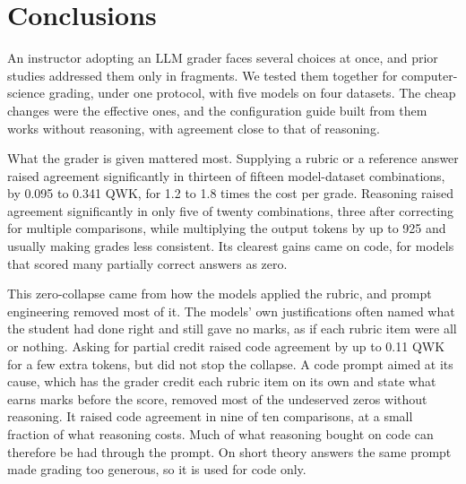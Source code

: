 
\section{Conclusions}
\label{sec:conclusion}

An instructor adopting an LLM grader faces several choices at once, and prior studies addressed them only in
fragments. We tested them together for computer-science grading, under one protocol, with five models on four
datasets. The cheap changes were the effective ones, and the configuration guide built from them works without
reasoning, with agreement close to that of reasoning.

What the grader is given mattered most. Supplying a rubric or a reference answer raised agreement significantly
in thirteen of fifteen model-dataset combinations, by 0.095 to 0.341 QWK, for 1.2 to 1.8 times the cost per grade.
Reasoning raised agreement significantly in only five of twenty combinations, three after correcting for multiple
comparisons, while multiplying the output tokens by up to 925 and usually making grades less consistent. Its
clearest gains came on code, for models that scored many partially correct answers as zero.

This zero-collapse came from how the models applied the rubric, and prompt engineering removed most of it. The
models' own justifications often named what the student had done right and still gave no marks, as if each rubric item
were all or nothing. Asking for partial credit raised code agreement by up to 0.11 QWK for a few extra tokens, but
did not stop the collapse. A code prompt aimed at its cause, which has the grader credit each rubric item on its
own and state what earns marks before the score, removed most of the undeserved zeros without reasoning. It
raised code agreement in nine of ten comparisons, at a small fraction of what reasoning costs. Much of what
reasoning bought on code can therefore be had through the prompt. On short theory answers the same prompt made
grading too generous, so it is used for code only.

